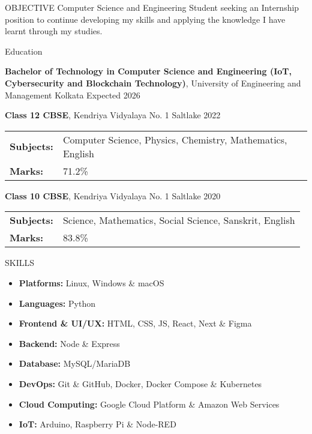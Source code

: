 \documentclass{resume}
\begin{document}
\vspace{0.8em}

\begin{rSection}{OBJECTIVE}
{Computer Science and Engineering Student seeking an Internship position to continue developing my skills and applying the knowledge I have learnt through my studies.}

\end{rSection}
\vspace{0.8em}
\begin{rSection}{Education}

{\bf Bachelor of Technology in Computer Science and Engineering (IoT, Cybersecurity and Blockchain Technology)}, University of Engineering and Management Kolkata \hfill {Expected 2026}\\
\vspace{1em}

{\bf Class 12 CBSE}, Kendriya Vidyalaya No. 1 Saltlake \hfill {2022}\\
\begin{tabular}{>{\bfseries}l l}
Subjects: & Computer Science, Physics, Chemistry, Mathematics, English \\
Marks: & 71.2\%
\end{tabular}

{\bf Class 10 CBSE}, Kendriya Vidyalaya No. 1 Saltlake \hfill {2020}
\begin{tabular}{>{\bfseries}l l}
Subjects: & Science, Mathematics, Social Science, Sanskrit, English \\
Marks: & 83.8\%
\end{tabular}
\end{rSection}
\vspace{0.8em}

\begin{rSection}{SKILLS}
\begin{itemize}
    \item \textbf{Platforms:} Linux, Windows \& macOS
    \item \textbf{Languages:} Python
    \item \textbf{Frontend \& UI/UX: } HTML, CSS, JS, React, Next \& Figma
    \item \textbf{Backend: } Node \& Express
    \item \textbf{Database: } MySQL/MariaDB
    \item \textbf{DevOps:} Git \& GitHub, Docker, Docker Compose \& Kubernetes
    \item \textbf{Cloud Computing:} Google Cloud Platform \& Amazon Web Services
    \item \textbf{IoT:} Arduino, Raspberry Pi \& Node-RED
\end{itemize}
\end{rSection}
\vspace{0.8em}
\end{document}
